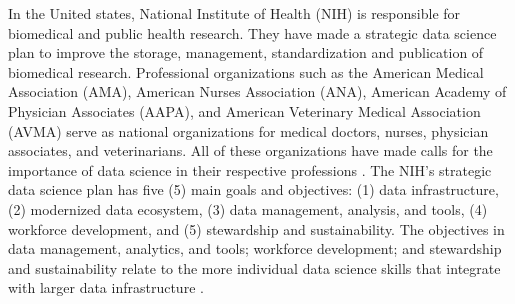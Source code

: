 \documentclass[020-persona\_validation.tex]{subfiles}
\begin{document}
    In the United states,
    National Institute of Health (NIH) is responsible for biomedical and public health research.
    They have made a strategic data science plan to improve the
    storage, management, standardization and publication of biomedical research.
    Professional organizations such as the
    American Medical Association (AMA),
    American Nurses Association (ANA),
    American Academy of Physician Associates (AAPA), and
    American Veterinary Medical Association (AVMA)
    serve as national organizations for medical doctors, nurses, physician associates, and veterinarians.
    All of these organizations have made calls for the importance of data science in their respective professions
    \cite{payneBiomedicalInformaticsMeets2018, americanmedicalassociationAcceleratingChangeMedical2021, americannursesassociationANAEnterpriseAmerican, owenEthicalIntersectionHealthcare2017, nolenArtificialIntelligenceVeterinary2020, nationalinstitutesofhealthNIHStrategicPlan2020}.
    The NIH's strategic data science plan has five (5) main goals and objectives:
    (1) data infrastructure,
    (2) modernized data ecosystem,
    (3) data management, analysis, and tools,
    (4) workforce development, and
    (5) stewardship and sustainability. %
    The objectives in
    data management, analytics, and tools;
    workforce development;
    and stewardship and sustainability
    relate to the more individual data science skills that integrate with larger data infrastructure
    \cite{nationalinstitutesofhealthNIHStrategicPlan2020}.


    
\end{document}
